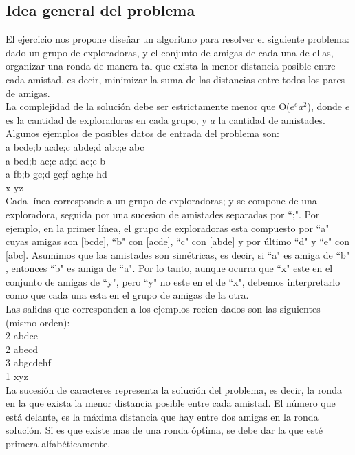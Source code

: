 \subsection{Idea general del problema}
El ejercicio nos propone diseñar un algoritmo para resolver el siguiente problema: dado un grupo de exploradoras, y el conjunto 
de amigas de cada una de ellas, organizar una ronda de manera tal que exista la menor distancia posible entre cada amistad, es 
decir, minimizar la suma de las distancias entre todos los pares de amigas. \\

La complejidad de la solución debe ser estrictamente menor que O($e^ea^2$), donde $e$ es la cantidad de exploradoras en cada grupo, y $a$ la cantidad de amistades. \\

Algunos ejemplos de posibles datos de entrada del problema son: \\

a bcde;b acde;c abde;d abc;e abc \\
a bcd;b ae;c ad;d ac;e b \\
a fb;b gc;d gc;f agh;e hd \\
x yz \\

Cada línea corresponde a un grupo de exploradoras; y se compone de una exploradora, seguida por una sucesion de amistades
separadas por ``;"$ $. Por ejemplo, en la primer línea, el grupo de exploradoras esta compuesto por ``a"$ $ cuyas amigas son [bcde],
``b"$ $ con [acde], ``c"$ $ con [abde] y por último ``d"$ $ y ``e"$ $ con  [abc]. Asumimos que las amistades son simétricas, es decir, si ``a"$ $ es
amiga de ``b"$ $, entonces ``b"$ $ es amiga de ``a"$ $. Por lo tanto, aunque ocurra que ``x"$ $ este en el conjunto de amigas de ``y"$ $, pero ``y"$ $ no este en el de ``x"$ $, debemos interpretarlo como que cada una esta en el grupo de amigas de la otra.  \\

Las salidas que corresponden a los ejemplos recien dados son las siguientes (mismo orden): \\
2 abdce \\
2 abecd \\
3 abgcdehf \\
1 xyz \\

La sucesión de caracteres representa la solución del problema, es decir, la ronda en la que exista la menor distancia posible entre cada amistad. El número que está delante, es la máxima distancia que hay entre dos amigas en la ronda solución. Si es que existe mas de una ronda óptima, se debe dar la que esté primera alfabéticamente. 

